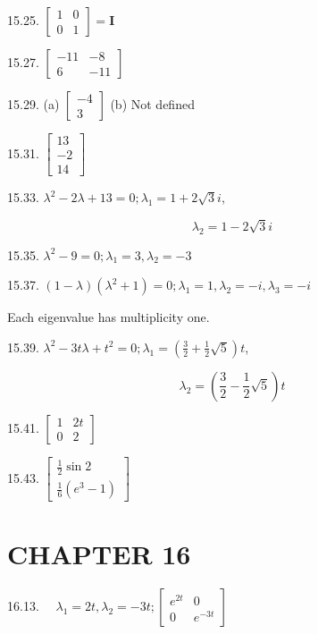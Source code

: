 \documentclass[10pt]{article}
\begin{document}
15.25. $\left[\begin{array}{ll}1 & 0 \\ 0 & 1\end{array}\right]=\mathbf{I}$

15.27. $\left[\begin{array}{rr}-11 & -8 \\ 6 & -11\end{array}\right]$

15.29. (a) $\left[\begin{array}{r}-4 \\ 3\end{array}\right]$ (b) Not defined

15.31. $\left[\begin{array}{c}13 \\ -2 \\ 14\end{array}\right]$

15.33. $\lambda^{2}-2 \lambda+13=0 ; \lambda_{1}=1+2 \sqrt{3} i$,

$$
\lambda_{2}=1-2 \sqrt{3} i
$$

15.35. $\lambda^{2}-9=0 ; \lambda_{1}=3, \lambda_{2}=-3$

15.37. $(1-\lambda)\left(\lambda^{2}+1\right)=0 ; \lambda_{1}=1, \lambda_{2}=-i, \lambda_{3}=-i$

Each eigenvalue has multiplicity one.

15.39. $\lambda^{2}-3 t \lambda+t^{2}=0 ; \lambda_{1}=\left(\frac{3}{2}+\frac{1}{2} \sqrt{5}\right) t$,

$$
\lambda_{2}=\left(\frac{3}{2}-\frac{1}{2} \sqrt{5}\right) t
$$

15.41. $\left[\begin{array}{cc}1 & 2 t \\ 0 & 2\end{array}\right]$

15.43. $\left[\begin{array}{c}\frac{1}{2} \sin 2 \\ \frac{1}{6}\left(e^{3}-1\right)\end{array}\right]$

\section*{CHAPTER 16}
16.13. $\quad \lambda_{1}=2 t, \lambda_{2}=-3 t ;\left[\begin{array}{cc}e^{2 t} & 0 \\ 0 & e^{-3 t}\end{array}\right]$
\end{document}
